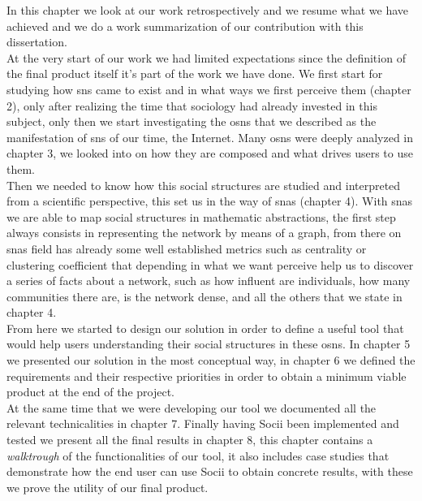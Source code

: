 In this chapter we look at our work retrospectively and we resume what we have achieved and we do a work summarization of our contribution with this
dissertation.\\
\indent At the very start of our work we had limited expectations since the definition of the final product itself it's part of the work we have done. We first start for studying how \glspl{sn} came to exist and in what ways we first perceive them (chapter 2), only after realizing the time that sociology had already invested in this subject, only then we start investigating the \glspl{osn} that we described as the manifestation of \glspl{sn} of our time, the Internet. Many \glspl{osn} were deeply analyzed in chapter 3, we looked into on how they are composed and what drives users to use them.\\
\indent Then we needed to know how this social structures are studied and interpreted from a scientific perspective, this set us in the way of \glspl{sna} (chapter 4). With \glspl{sna} we are able to map social structures in mathematic abstractions, the first step always consists in representing the network by means of a graph, from there on \glspl{sna} field has already some well established metrics such as centrality or clustering coefficient that depending in what we want perceive help us to discover a series of facts about a network, such as how influent are individuals, how many communities there are, is the network dense, and all the others that we state in chapter 4.\\
\indent From here we started to design our solution in order to define a useful tool that would help users understanding their social structures in these \glspl{osn}. In chapter 5 we presented our solution in the most conceptual way, in chapter 6 we defined the requirements and their respective priorities in order to obtain a minimum viable product at the end of the project.\\
\indent At the same time that we were developing our tool we documented all the relevant technicalities in chapter 7. Finally having Socii been implemented and tested we present all the final results in chapter 8, this chapter contains a \textit{walktrough} of the functionalities of our tool, it also includes case studies that demonstrate how the end user can use Socii to obtain concrete results, with these we prove the utility of our final product.

